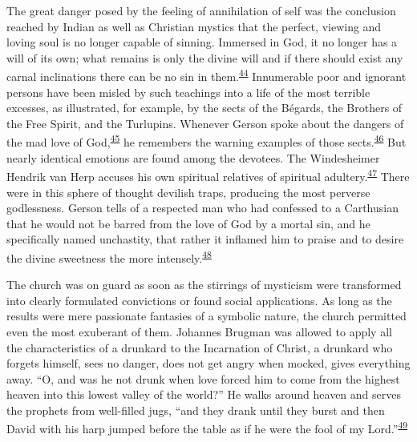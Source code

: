 The great danger posed by the feeling of annihilation of self was the
conclusion reached by Indian as well as Christian mystics that the
perfect, viewing and loving soul is no longer capable of sinning.
Immersed in God, it no longer has a will of its own; what remains is
only the divine will and if there should exist any carnal inclinations
there can be no sin in
them.\textsuperscript{\protect\hypertarget{15_Chapter_Eight__RELIGIOUS_EXCITAT.xhtmlux5cux23id_820}{\protect\hyperlink{23_NOTES.xhtmlux5cux23id_821}{44}}}
Innumerable poor and ignorant persons have been misled by such teachings
into a life of the most terrible excesses, as illustrated, for example,
by the sects of the Bégards, the Brothers of the Free Spirit, and the
Turlupins. Whenever Gerson spoke about the dangers of the mad love of
God,\textsuperscript{\protect\hypertarget{15_Chapter_Eight__RELIGIOUS_EXCITAT.xhtmlux5cux23id_818}{\protect\hyperlink{23_NOTES.xhtmlux5cux23id_819}{45}}}
he remembers the warning examples of those
sects.\textsuperscript{\protect\hypertarget{15_Chapter_Eight__RELIGIOUS_EXCITAT.xhtmlux5cux23id_816}{\protect\hyperlink{23_NOTES.xhtmlux5cux23id_817}{46}}}
But nearly identical emotions are found among the devotees. The
Windesheimer Hendrik van Herp accuses his own spiritual relatives of
spiritual
\protect\hypertarget{15_Chapter_Eight__RELIGIOUS_EXCITAT.xhtmlux5cux23page_230}{}{}adultery.\textsuperscript{\protect\hypertarget{15_Chapter_Eight__RELIGIOUS_EXCITAT.xhtmlux5cux23id_814}{\protect\hyperlink{23_NOTES.xhtmlux5cux23id_815}{47}}}
There were in this sphere of thought devilish traps, producing the most
perverse godlessness. Gerson tells of a respected man who had confessed
to a Carthusian that he would not be barred from the love of God by a
mortal sin, and he specifically named unchastity, that rather it
inflamed him to praise and to desire the divine sweetness the more
intensely.\textsuperscript{\protect\hypertarget{15_Chapter_Eight__RELIGIOUS_EXCITAT.xhtmlux5cux23id_812}{\protect\hyperlink{23_NOTES.xhtmlux5cux23id_813}{48}}}

The church was on guard as soon as the stirrings of mysticism were
transformed into clearly formulated convictions or found social
applications. As long as the results were mere passionate fantasies of a
symbolic nature, the church permitted even the most exuberant of them.
Johannes Brugman was allowed to apply all the characteristics of a
drunkard to the Incarnation of Christ, a drunkard who forgets himself,
sees no danger, does not get angry when mocked, gives everything away.
``O, and was he not drunk when love forced him to come from the highest
heaven into this lowest valley of the world?'' He walks around heaven
and serves the prophets from well-filled jugs, ``and they drank until
they burst and then David with his harp jumped before the table as if he
were the fool of my
Lord.''\textsuperscript{\protect\hypertarget{15_Chapter_Eight__RELIGIOUS_EXCITAT.xhtmlux5cux23id_810}{\protect\hyperlink{23_NOTES.xhtmlux5cux23id_811}{49}}}

